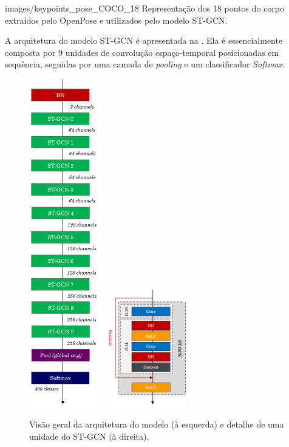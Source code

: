     {images/keypoints_pose_COCO_18}
    {Representação dos 18 pontos do corpo extraídos pelo OpenPose e utilizados pelo modelo ST-GCN.}

A arquitetura do modelo ST-GCN é apresentada na . Ela é essencialmente composta por 9 unidades de convolução espaço-temporal posicionadas em sequência, seguidas por uma camada de \textit{pooling} e um classificador \textit{Softmax}.

\begin{figure}[ht]
    \centering
    \includegraphics[width=3.2cm]{images/st_gcn_architecture}
    \includegraphics[width=3.5cm]{images/st_gcn_architeture_unit}
    \caption{Visão geral da arquitetura do modelo (à esquerda) e detalhe de uma unidade do ST-GCN (à direita).}
    \label{fig:st-gcn-architecture}
\end{figure}


